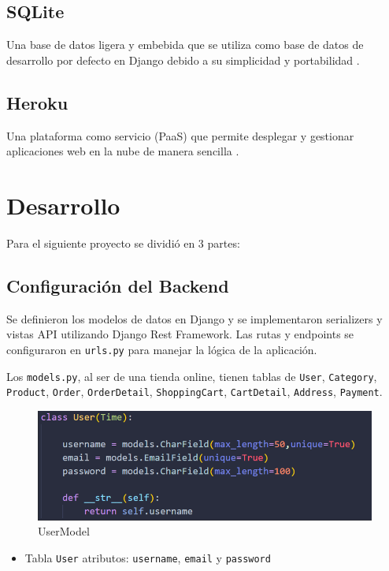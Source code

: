 \documentclass[conference]{IEEEtran}
\begin{document}
\subsection{SQLite}
Una base de datos ligera y embebida que se utiliza como base de datos de desarrollo por defecto en Django debido a su simplicidad y portabilidad \cite{sqlite}.

\subsection{Heroku}
Una plataforma como servicio (PaaS) que permite desplegar y gestionar aplicaciones web en la nube de manera sencilla \cite{heroku}.

\section{Desarrollo}
Para el siguiente proyecto se dividió en 3 partes:

\subsection{Configuración del Backend}
Se definieron los modelos de datos en Django y se implementaron serializers y vistas API utilizando Django Rest Framework. Las rutas y endpoints se configuraron en \texttt{urls.py} para manejar la lógica de la aplicación.

Los \texttt{models.py}, al ser de una tienda online, tienen tablas de \texttt{User}, \texttt{Category}, \texttt{Product}, \texttt{Order}, \texttt{OrderDetail}, \texttt{ShoppingCart}, \texttt{CartDetail}, \texttt{Address}, \texttt{Payment}.

\begin{figure}[htbp]
    \centering
    \includegraphics[width=\linewidth]{img/model.png}
    \caption{UserModel}
    \label{fig:etiqueta}
\end{figure}
\begin{itemize}
    \item Tabla \texttt{User} atributos: \texttt{username}, \texttt{email} y \texttt{password}
\end{itemize}
\end{document}
